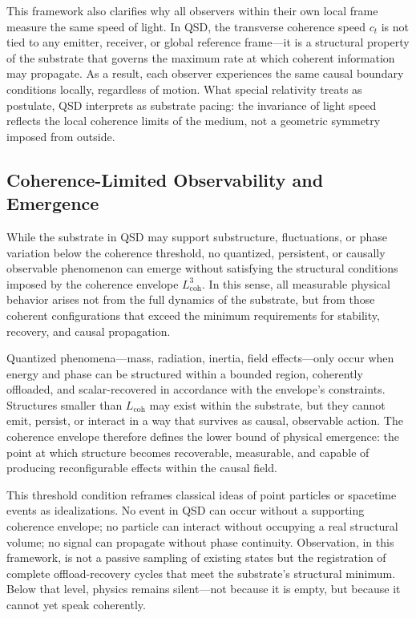 \documentclass[entropy,article,submit,pdftex,moreauthors]{Definitions/mdpi}
\begin{document}
This framework also clarifies why all observers within their own local frame measure the same speed of light. In QSD, the transverse coherence speed \( c_t \) is not tied to any emitter, receiver, or global reference frame—it is a structural property of the substrate that governs the maximum rate at which coherent information may propagate. As a result, each observer experiences the same causal boundary conditions locally, regardless of motion. What special relativity treats as postulate, QSD interprets as substrate pacing: the invariance of light speed reflects the local coherence limits of the medium, not a geometric symmetry imposed from outside.

\subsection{Coherence-Limited Observability and Emergence}

While the substrate in QSD may support substructure, fluctuations, or phase variation below the coherence threshold, no quantized, persistent, or causally observable phenomenon can emerge without satisfying the structural conditions imposed by the coherence envelope \texorpdfstring{\( L_{\text{coh}}^3 \)}{Lcoh\^{}3}. In this sense, all measurable physical behavior arises not from the full dynamics of the substrate, but from those coherent configurations that exceed the minimum requirements for stability, recovery, and causal propagation.

Quantized phenomena—mass, radiation, inertia, field effects—only occur when energy and phase can be structured within a bounded region, coherently offloaded, and scalar-recovered in accordance with the envelope’s constraints. Structures smaller than \texorpdfstring{\( L_{\text{coh}} \)}{Lcoh} may exist within the substrate, but they cannot emit, persist, or interact in a way that survives as causal, observable action. The coherence envelope therefore defines the lower bound of physical emergence: the point at which structure becomes recoverable, measurable, and capable of producing reconfigurable effects within the causal field.

This threshold condition reframes classical ideas of point particles or spacetime events as idealizations. No event in QSD can occur without a supporting coherence envelope; no particle can interact without occupying a real structural volume; no signal can propagate without phase continuity. Observation, in this framework, is not a passive sampling of existing states but the registration of complete offload-recovery cycles that meet the substrate’s structural minimum. Below that level, physics remains silent—not because it is empty, but because it cannot yet speak coherently.
\end{document}
